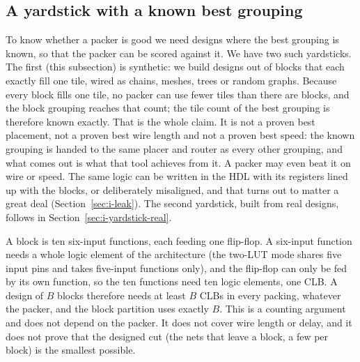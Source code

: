 \subsection{A yardstick with a known best grouping}
\label{sec:i-yardstick}

 To know whether a packer is good we need designs where the best grouping is known, so that the packer can be scored against it. We have two such yardsticks. The first (this subsection) is synthetic: we build designs out of blocks that each exactly fill one tile, wired as chains, meshes, trees or random graphs. Because every block fills one tile, no packer can use fewer tiles than there are blocks, and the block grouping reaches that count; the tile count of the best grouping is therefore known exactly. That is the whole claim. It is not a proven best placement, not a proven best wire length and not a proven best speed: the known grouping is handed to the same placer and router as every other grouping, and what comes out is what that tool achieves from it. A packer may even beat it on wire or speed. The same logic can be written in the HDL with its registers lined up with the blocks, or deliberately misaligned, and that turns out to matter a great deal (Section~\ref{sec:i-leak}). The second yardstick, built from real designs, follows in Section~\ref{sec:i-yardstick-real}.

 A block is ten six-input functions, each feeding one flip-flop. A six-input function needs a whole logic element of the architecture (the two-LUT mode shares five input pins and takes five-input functions only), and the flip-flop can only be fed by its own function, so the ten functions need ten logic elements, one CLB. A design of $B$ blocks therefore needs at least $B$ CLBs in every packing, whatever the packer, and the block partition uses exactly $B$. This is a counting argument and does not depend on the packer. It does not cover wire length or delay, and it does not prove that the designed cut (the nets that leave a block, a few per block) is the smallest possible.

